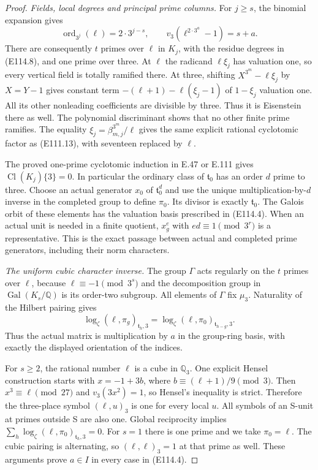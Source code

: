 \begin{proof}
\emph{Fields, local degrees and principal prime columns.}
For $j\ge s$, the binomial expansion gives
\[
 \operatorname{ord}_{3^j}(\ell)=2\cdot3^{j-s},
 \qquad v_3(\ell^{2\cdot3^a}-1)=s+a.
 \tag{E114.11}
\]
There are consequently $t$ primes over $\ell$ in $K_j$,
with the residue degrees in (E114.8), and one prime over
three. At $\ell$ the radicand $\ell\xi_j$ has valuation
one, so every vertical field is totally ramified there.
At three, shifting $X^{3^m}-\ell\xi_j$ by $X=Y-1$
gives constant term $-(\ell+1)-\ell(\xi_j-1)$ of
$1-\xi_j$ valuation one. All its other nonleading
coefficients are divisible by three. Thus it is
Eisenstein there as well. The polynomial discriminant
shows that no other finite prime ramifies.
The equality $\xi_j=\beta_{m,j}^{3^m}/\ell$ gives the
same explicit rational cyclotomic factor as (E111.13),
with seventeen replaced by $\ell$.

The proved one-prime cyclotomic induction in E.47 or
E.111 gives $\operatorname{Cl}(K_j)\{3\}=0$.
In particular the ordinary class of $\mathfrak t_0$
has an order $d$ prime to three. Choose an actual
generator $x_0$ of $\mathfrak t_0^d$ and use the
unique multiplication-by-$d$ inverse in the completed
group to define $\pi_0$. Its divisor is exactly
$\mathfrak t_0$. The Galois orbit of these elements
has the valuation basis prescribed in (E114.4).
When an actual unit is needed in a finite quotient,
$x_g^e$ with $ed\equiv1\pmod{3^r}$ is a representative.
This is the exact passage between actual and completed
prime generators, including their norm characters.

\emph{The uniform cubic character inverse.}
The group $\Gamma$ acts regularly on the $t$ primes
over $\ell$, because $\ell\equiv-1\pmod{3^s}$ and
the decomposition group in $\operatorname{Gal}(K_s/\mathbb Q)$
is its order-two subgroup. All elements of $\Gamma$
fix $\mu_3$. Naturality of the Hilbert pairing gives
\[
 \log_\zeta(\ell,\pi_g)_{\mathfrak t_h,3}
       =\log_\zeta(\ell,\pi_0)_{\mathfrak t_{h-g},3}.
 \tag{E114.12}
\]
Thus the actual matrix is multiplication by $a$ in
the group-ring basis, with exactly the displayed
orientation of the indices.

For $s\ge2$, the rational number $\ell$ is a cube in
$\mathbb Q_3$. One explicit Hensel construction starts
with $x=-1+3b$, where
$b\equiv(\ell+1)/9\pmod3$. Then $x^3\equiv\ell\pmod{27}$
and $v_3(3x^2)=1$, so Hensel's inequality is strict.
Therefore the three-place symbol $(\ell,u)_3$ is one
for every local $u$. All symbols of an S-unit at primes
outside S are also one. Global reciprocity implies
$\sum_h\log_\zeta(\ell,\pi_0)_{\mathfrak t_h,3}=0$.
For $s=1$ there is one prime and we take $\pi_0=\ell$.
The cubic pairing is alternating, so $(\ell,\ell)_3=1$
at that prime as well. These arguments prove $a\in I$
in every case in (E114.4).


\end{proof}
